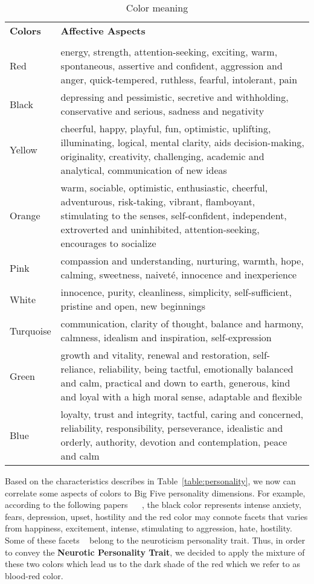 \begin{table} [h]
\centering
\begin{tabular}{ | m{8em} | m{25em}| } 
\hline
\textbf{Colors} & \textbf{Affective Aspects}  \\ 
\\
\hline
Red & energy, strength, attention-seeking, exciting, warm, spontaneous, assertive and confident, aggression and anger, quick-tempered, ruthless, fearful, intolerant, pain  \\
\hline 
Black & depressing and pessimistic, secretive and withholding, conservative and serious, sadness and negativity  \\
\hline 
Yellow & cheerful, happy, playful, fun, optimistic, uplifting, illuminating, logical, mental clarity, aids decision-making, originality, creativity, challenging, academic and analytical, communication of new ideas   \\
\hline 
Orange & warm, sociable, optimistic, enthusiastic, cheerful, adventurous, risk-taking, vibrant, flamboyant, stimulating to the senses,  self-confident, independent, extroverted and uninhibited, attention-seeking, encourages to socialize  \\
\hline 
Pink & compassion and understanding, nurturing, warmth, hope, calming, sweetness, naiveté, innocence and inexperience  \\
\hline
White & innocence, purity, cleanliness, simplicity, self-sufficient, pristine and open, new beginnings  \\
\hline
Turquoise &  communication, clarity of thought, balance and harmony, calmness, idealism and inspiration, self-expression \\
\hline
Green & growth and vitality, renewal and restoration, self-reliance, reliability, being tactful, emotionally balanced and calm, practical and down to earth, generous, kind and loyal with a high moral sense, adaptable and flexible  \\
\hline
Blue &  loyalty, trust and integrity, tactful, caring and concerned, reliability, responsibility, perseverance, idealistic and orderly, authority, devotion and contemplation, peace and calm \\
\hline
\end{tabular}
\caption{Color meaning}
\label{table:color}
\end{table}

\par Based on the characteristics describes in Table~\ref{table:personality}, we now can correlate some aspects of colors to Big Five personality dimensions. For example, according to the following papers ~\cite{alschuler1943easel} ~\cite{schaie1961scaling}, the black color represents intense anxiety, fears, depression, upset, hostility and the red color may connote facets that varies from happiness, excitement, intense, stimulating to aggression, hate, hostility. Some of these facets ~\cite{costa1988catalog} belong to the neuroticism personality trait. Thus, in order to convey the \textbf{Neurotic Personality Trait}, we decided to apply the mixture of these two colors which lead us to the dark shade of the red which we refer to as blood-red color.

